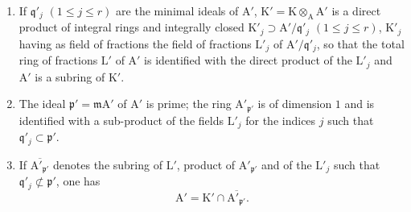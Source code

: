 \begin{env}
\label{IV.6.14.1.2.env}
\begin{enumerate}[label=(\roman*)]
  \item If $\mathfrak{q}'_j$ $(1\leqslant j\leqslant r)$ are the minimal ideals of $\mathrm{A}'$, $\mathrm{K}'=\mathrm{K}\otimes_\mathrm{A}\mathrm{A}'$ is a direct product
of integral rings and integrally closed $\mathrm{K}'_j\supset\mathrm{A}'/\mathfrak{q}'_j$ $(1\leqslant j\leqslant r)$, $\mathrm{K}'_j$ having as field of fractions
the field of fractions $\mathrm{L}'_j$ of $\mathrm{A}'/\mathfrak{q}'_j$, so that the total ring of fractions $\mathrm{L}'$ of $\mathrm{A}'$
is identified with the direct product of the $\mathrm{L}'_j$ and $\mathrm{A}'$ is a subring of $\mathrm{K}'$.
  \item The ideal $\mathfrak{p}'=\mathfrak{m}\mathrm{A}'$ of $\mathrm{A}'$ is prime; the ring $\mathrm{A}'_{\mathfrak{p}'}$ is of dimension $1$ and is identified
with a sub-product of the fields $\mathrm{L}'_j$ for the indices $j$ such that $\mathfrak{q}'_j\subset\mathfrak{p}'$.
  \item If $\overline{\mathrm{A}'_{\mathfrak{p}'}}$ denotes the subring of $\mathrm{L}'$, product of $\mathrm{A}'_{\mathfrak{p}'}$ and of the $\mathrm{L}'_j$ such that $\mathfrak{q}'_j\not\subset\mathfrak{p}'$, one has
\begin{equation}
\tag{6.14.1.3}
\label{IV.6.14.1.3}
  \mathrm{A}'=\mathrm{K}'\cap\overline{\mathrm{A}'_{\mathfrak{p}'}}.
\end{equation}
\end{enumerate}
\end{env}

